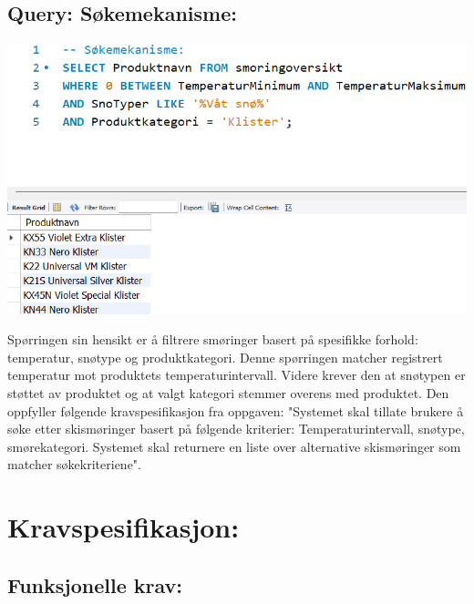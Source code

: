 \documentclass[10pt, a4paper]{article}
\begin{document}
\subsection{Query: Søkemekanisme:}

\includegraphics[width=\textwidth]{query_sokemekanisme.png}

Spørringen sin hensikt er å filtrere smøringer basert på spesifikke forhold: temperatur, snøtype og produktkategori. Denne spørringen matcher registrert temperatur mot produktets temperaturintervall. Videre krever den at snøtypen er støttet av produktet og at valgt kategori stemmer overens med produktet. Den oppfyller følgende kravspesifikasjon fra oppgaven: "Systemet skal tillate brukere å søke etter skismøringer basert på følgende kriterier: Temperaturintervall, snøtype, smørekategori. Systemet skal returnere en liste over alternative skismøringer som matcher søkekriteriene". 

\section{Kravspesifikasjon:}

\subsection{Funksjonelle krav:}
\end{document}
